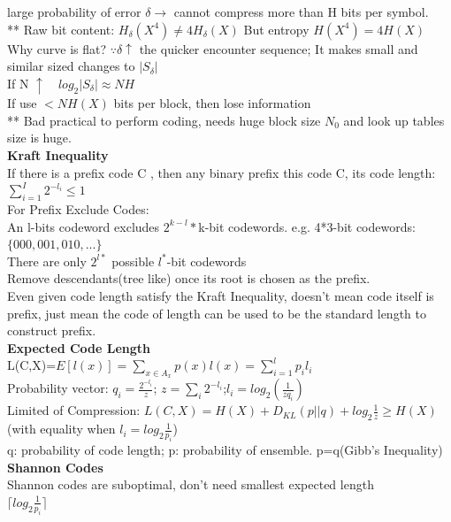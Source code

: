 \documentclass[12pt,a4paper]{extarticle}
\begin{document}
large probability of error $\delta \to$ cannot compress more than H bits per symbol.\\
** Raw bit content: $H_\delta(X^4) \neq 4H_\delta(X)$ But entropy $H(X^4)=4H(X)$\\
Why curve is flat? $\because \delta \uparrow$ the quicker encounter sequence; It makes small and similar sized changes to $|S_\delta|$\\
If N $\uparrow \quad log_2|S_\delta| \approx NH$\\
If use $< NH(X)$ bits per block, then lose information\\
** Bad practical to perform coding, needs huge block size $N_0$ and look up tables size is huge.\\
\newline
\textbf{Kraft Inequality}\\
If there is a prefix code C , then any binary prefix this code C, its code length: $\sum^I_{i=1}2^{-l_i}\leq 1$\\
For Prefix Exclude Codes:\\
An l-bits codeword excludes $2^{k-l}*$k-bit codewords. e.g. 4*3-bit codewords:$\{000,001,010,...\}$\\
There are only $2^{l*}$ possible $l^*$-bit codewords\\
Remove descendants(tree like) once its root is chosen as the prefix. \\
Even given code length satisfy the Kraft Inequality, doesn't mean code itself is prefix, just mean the code of length can be used to be the standard length to construct prefix.\\
\newline
\textbf{Expected Code Length}\\
L(C,X)=$E[l(x)]=\sum_{x\in A_x}p(x)l(x)=\sum^l_{i=1}p_il_i$\\
Probability vector: $q_i = \frac{2^{-l_i}}{z}$; \quad  $z=\sum_i 2^{-l_i}$;\quad $l_i = log_2(\frac{1}{zq_i})$\\
Limited of Compression: $L(C,X)=H(X)+D_{KL}(p||q)+log_2\frac{1}{z}\geq H(X)$(with equality when $l_i=log_2\frac{1}{p_i}$)\\
q: probability of code length; p: probability of ensemble. p=q(Gibb's Inequality)\\
\newline
\textbf{Shannon Codes}\\
Shannon codes are suboptimal, don't need smallest expected length\\
$\lceil log_2\frac{1}{p_i}\rceil$\\
\end{document}
